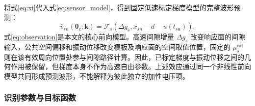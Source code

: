 \documentclass[UTF8,12pt,a4paper]{ctexart}
\newcommand{\Fsen}{\mathcal{F}}
\begin{document}
将式\eqref{eq:xi}代入式\eqref{eq:sensor_model}，得到固定低速标定梯度模型的完整波形预测：
\begin{equation}
\widehat v_{sn}(\bm\theta_c;\bm k)
=\Fsen_s\!\left(
\Delta g_s,
x_{sn}-d-u(t_{sn})
\right).
\label{eq:observation}
\end{equation}
式\eqref{eq:observation}是本文的核心前向模型。高速间隙增量 $\Delta g_s$ 改变响应面的间隙输入，公共空间偏移和振动位移改变模板及响应面的空间取值位置，固定的 $\mu_s^{\mathrm{cal}}$ 则在该有效周向位置处参与间隙路径计算。因此，已标定梯度与振动位移之间的几何作用被保留，但梯度本身不作为高速自由参数。上述效应通过同一个非线性前向模型共同形成预测波形，不能解释为彼此独立的加性电压项。

\subsubsection{识别参数与目标函数}
\end{document}

